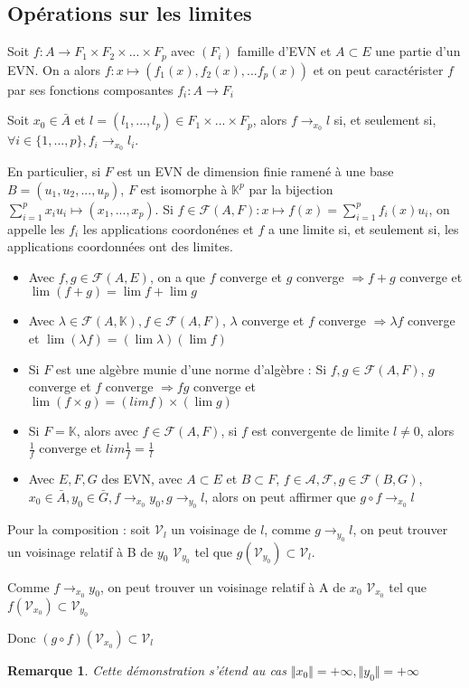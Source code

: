 \documentclass[a4paper,12pt]{book}
\newcommand{\Prop}[2]{\begin{tcolorbox}[sharp corners, colback=white,colframe=red!90!black!75, title=Proposition : #1]#2\end{tcolorbox}}
\newcommand{\Pre}[1]{\begin{tcolorbox}[sharp corners, colback=white,colframe=green!60!green!30!black!75, title=Preuve]#1\end{tcolorbox}}
\newtheorem{Rem}{Remarque}[section]
\def\K{\mathbb{K}}
\begin{document}
\subsection{Opérations sur les limites}
\Prop{Limite d'une fonction à valeurs dans un produit cartésien}{Soit $f:A\to F_1\times F_2\times...\times F_p$ avec $(F_i)$ famille d'EVN et $A\subset E$ une partie d'un EVN. On a alors $f:x\mapsto (f_1(x),f_2(x),... f_p(x))$ et on peut caractérister $f$ par ses fonctions composantes $f_i:A\to F_i$
\par Soit $x_0\in\bar{A}$ et $l=(l_1,...,l_p)\in F_1\times...\times F_p$, alors $f\to_{x_0} l$ si, et seulement si, $\forall i\in\{1,...,p\}, f_i\to_{x_0} l_i$.
\par En particulier, si $F$ est un EVN de dimension finie ramené à une base $B=(u_1, u_2,...,u_p)$, $F$ est isomorphe à $\K^p$ par la bijection $\sum\limits_{i=1}^px_iu_i\mapsto (x_1,...,x_p)$. Si $f\in\mathcal{F}(A,F) : x\mapsto f(x)=\sum\limits_{i=1}^pf_i(x)u_i$, on appelle les $f_i$ les applications coordonénes et $f$ a une limite si, et seulement si, les applications coordonnées ont des limites.}
\Prop{Opérations sur les fonctions convergentes}{\begin{itemize}
\item Avec $f,g\in\mathcal{F}(A,E)$, on a que $f$ converge et $g$ converge $\Rightarrow f+g$ converge et $\lim(f+g) = \lim f+\lim g$
\item Avec $\lambda\in\mathcal{F}(A,\K), f\in\mathcal{F}(A,F)$, $\lambda$ converge et $f$ converge $\Rightarrow \lambda f$ converge et $\lim(\lambda f) =(\lim\lambda)(\lim f)$
\item Si $F$ est une algèbre munie d'une norme d'algèbre : Si $f,g\in\mathcal{F}(A,F)$, $g$ converge et $f$ converge $\Rightarrow fg$ converge et $\lim (f\times g)=(lim f)\times(\lim g)$
\item Si $F=\K$, alors avec $f\in\mathcal{F}(A,F)$, si $f$ est convergente de limite $l\neq0$, alors $\frac{1}{f}$ converge et $lim\frac{1}{f}=\frac{1}{l}$
\item Avec $E,F,G$ des EVN, avec $A\subset E$ et $B\subset F$, $f\in\mathcal{A,F}, g\in\mathcal{F}(B,G)$, $x_0\in\bar{A}, y_0\in\bar{G}, f\to_{x_0} y_0, g\to_{y_0}l$, alors on peut affirmer que $g\circ f\to_{x_0} l$
\end{itemize}}
\Pre{Pour la composition : soit $\mathcal{V}_l$ un voisinage de $l$, comme $g\to_{y_0} l$, on peut trouver un voisinage relatif à B de $y_0$ $\mathcal{V}_{y_0}$ tel que $g(\mathcal{V}_{y_0})\subset\mathcal{V}_l$. \par Comme $f\to_{x_0}y_0$, on peut trouver un voisinage relatif à A de $x_0$ $\mathcal{V}_{x_0}$ tel que $f(\mathcal{V}_{x_0})\subset\mathcal{V}_{y_0}$ \par Donc $(g\circ f)(\mathcal{V}_{x_0})\subset\mathcal{V}_l$}
\begin{Rem}
Cette démonstration s'étend au cas $\Vert x_0\Vert=+\infty, \Vert y_0\Vert=+\infty$ 
\end{Rem}
\end{document}
